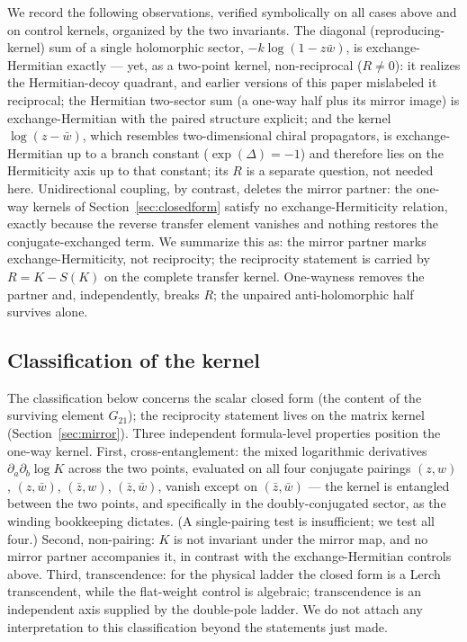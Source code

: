 \documentclass[11pt,a4paper]{article}
\newcommand{\zb}{\bar{z}}
\newcommand{\wb}{\bar{w}}
\begin{document}
We record the following observations, verified symbolically on all cases above
and on control kernels, organized by the two invariants. The diagonal
(reproducing-kernel) sum of a single holomorphic sector, $-k \log(1 - z\wb)$,
is exchange-Hermitian exactly --- yet, as a two-point kernel, non-reciprocal
($R \neq 0$): it realizes the Hermitian-decoy quadrant, and earlier versions
of this paper mislabeled it reciprocal; the Hermitian two-sector sum
(a one-way half plus its mirror image) is exchange-Hermitian with the paired
structure explicit; and the kernel $\log(z - \wb)$, which resembles
two-dimensional chiral propagators, is exchange-Hermitian up to a branch
constant ($\exp(\Delta) = -1$) and therefore lies on the Hermiticity axis up
to that constant; its $R$ is a separate question, not needed here.
Unidirectional coupling, by contrast, deletes the mirror partner: the one-way
kernels of Section~\ref{sec:closedform} satisfy no exchange-Hermiticity
relation, exactly because the reverse transfer element vanishes and nothing
restores the conjugate-exchanged term. We summarize this as: the mirror
partner marks exchange-Hermiticity, not reciprocity; the reciprocity statement
is carried by $R = K - S(K)$ on the complete transfer kernel. One-wayness
removes the partner and, independently, breaks $R$; the unpaired
anti-holomorphic half survives alone.

\subsection{Classification of the kernel}

The classification below concerns the scalar closed form (the content of the
surviving element $G_{21}$); the reciprocity statement lives on the matrix
kernel (Section~\ref{sec:mirror}). Three independent formula-level
properties position the one-way kernel. First,
cross-entanglement: the mixed logarithmic derivatives
$\partial_a \partial_b \log K$ across the two points, evaluated on all four
conjugate pairings $(z,w)$, $(z,\wb)$, $(\zb,w)$, $(\zb,\wb)$, vanish except on
$(\zb, \wb)$ --- the kernel is entangled between the two points, and
specifically in the doubly-conjugated sector, as the winding bookkeeping
dictates. (A single-pairing test is insufficient; we test all four.) Second,
non-pairing: $K$ is not invariant under the mirror map, and no mirror partner
accompanies it, in contrast with the exchange-Hermitian controls above. Third,
transcendence: for the physical ladder the closed form is a Lerch transcendent,
while the flat-weight control is algebraic; transcendence is an independent
axis supplied by the double-pole ladder. We do not attach any interpretation to
this classification beyond the statements just made.
\end{document}
